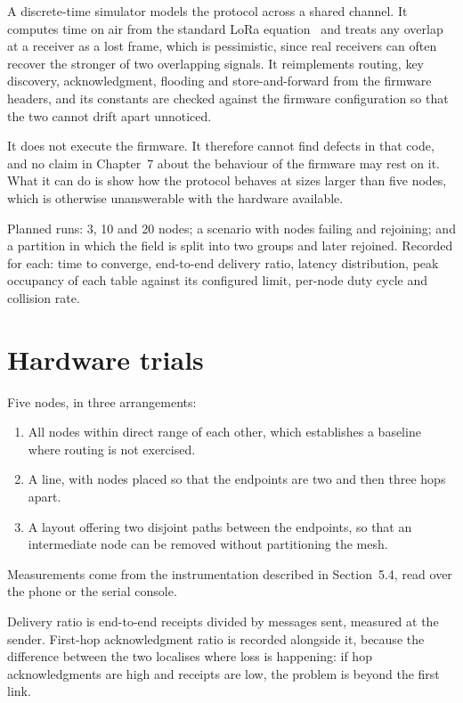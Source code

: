 \documentclass[12pt,a4paper,oneside]{report}
\begin{document}
A discrete-time simulator models the protocol across a shared channel. It
computes time on air from the standard LoRa equation~\cite{semtech2013toa} and
treats any overlap at a receiver as a lost frame, which is pessimistic, since
real receivers can often recover the stronger of two overlapping signals. It
reimplements routing, key discovery, acknowledgment, flooding and
store-and-forward from the firmware headers, and its constants are checked
against the firmware configuration so that the two cannot drift apart unnoticed.

It does not execute the firmware. It therefore cannot find defects in that code,
and no claim in Chapter~7 about the behaviour of the firmware may rest on it.
What it can do is show how the protocol behaves at sizes larger than five nodes,
which is otherwise unanswerable with the hardware available.

Planned runs: 3, 10 and 20 nodes; a scenario with nodes failing and rejoining;
and a partition in which the field is split into two groups and later rejoined.
Recorded for each: time to converge, end-to-end delivery ratio, latency
distribution, peak occupancy of each table against its configured limit, per-node
duty cycle and collision rate.

\section{Hardware trials}

Five nodes, in three arrangements:

\begin{enumerate}
\item All nodes within direct range of each other, which establishes a baseline
      where routing is not exercised.
\item A line, with nodes placed so that the endpoints are two and then three hops
      apart.
\item A layout offering two disjoint paths between the endpoints, so that an
      intermediate node can be removed without partitioning the mesh.
\end{enumerate}

Measurements come from the instrumentation described in Section~5.4, read over
the phone or the serial console.

Delivery ratio is end-to-end receipts divided by messages sent, measured at the
sender. First-hop acknowledgment ratio is recorded alongside it, because the
difference between the two localises where loss is happening: if hop
acknowledgments are high and receipts are low, the problem is beyond the first
link.
\end{document}
